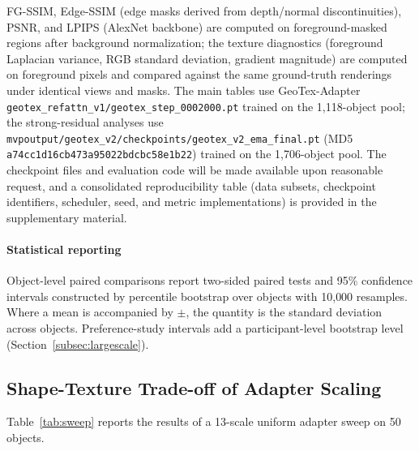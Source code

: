 \documentclass[times,twocolumn,final]{elsarticle}
\begin{document}
FG-SSIM, Edge-SSIM (edge masks derived from depth/normal discontinuities), PSNR, and LPIPS (AlexNet backbone) are computed on foreground-masked regions after background normalization; the texture diagnostics (foreground Laplacian variance, RGB standard deviation, gradient magnitude) are computed on foreground pixels and compared against the same ground-truth renderings under identical views and masks. The main tables use GeoTex-Adapter \texttt{geotex\_refattn\_v1/geotex\_step\_0002000.pt} trained on the 1{,}118-object pool; the strong-residual analyses use \texttt{mvpoutput/geotex\_v2/checkpoints/geotex\_v2\_ema\_final.pt} (MD5 \texttt{a74cc1d16cb473a95022bdcbc58e1b22}) trained on the 1{,}706-object pool. The checkpoint files and evaluation code will be made available upon reasonable request, and a consolidated reproducibility table (data subsets, checkpoint identifiers, scheduler, seed, and metric implementations) is provided in the supplementary material.

\paragraph{Statistical reporting}
Object-level paired comparisons report two-sided paired tests and 95\% confidence intervals constructed by percentile bootstrap over objects with 10{,}000 resamples. Where a mean is accompanied by $\pm$, the quantity is the standard deviation across objects. Preference-study intervals add a participant-level bootstrap level (Section~\ref{subsec:largescale}).

\subsection{Shape-Texture Trade-off of Adapter Scaling}
\label{subsec:tradeoff}

Table~\ref{tab:sweep} reports the results of a 13-scale uniform adapter sweep on 50 objects.
\end{document}
